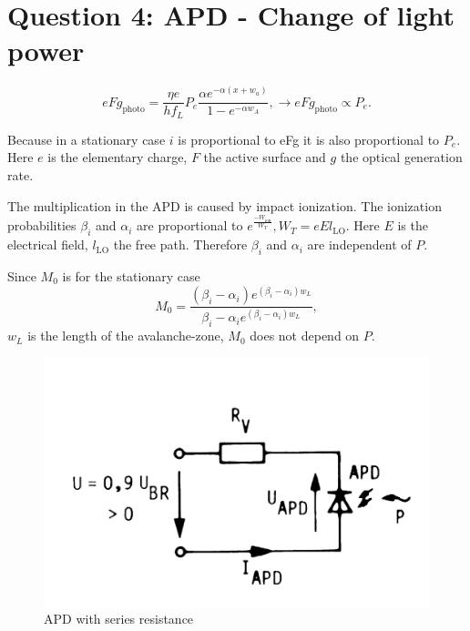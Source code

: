  

\section{Question 4: APD - Change of light power}

\begin{equation}
eFg_{\mathrm{photo}} = \frac{\eta e}{hf_L}P_e\frac{\alpha e^{-\alpha(x+w_a)}}{1-e^{-\alpha w_A}}, \rightarrow eFg_{\mathrm{photo}} \propto P_e.
\label{eq:}
\end{equation}

Because in a stationary case $i$ is proportional to eFg it is also proportional to $P_e$. Here $e$ is the elementary charge, $F$ the active surface and $g$ the optical generation rate.
 
The multiplication in the APD is caused by impact ionization. The ionization probabilities $\beta_i$ and $\alpha_i$ are proportional to $e^{\frac{-W_{\mathrm{ion}}}{W_T}},  W_T=eEl_\mathrm{LO}$. Here $E$ is the electrical field, $l_\mathrm{LO}$ the free path. Therefore $\beta_i$ and $\alpha_i$ are independent of $P$.

Since $M_0$ is for the stationary case 
\begin{equation}
M_0=\frac{(\beta_i  -\alpha_i)e^{(\beta_i-\alpha_i)w_L}}{\beta_i - \alpha_i e^{(\beta_i - \alpha_i)w_L}},
\label{eq:}
\end{equation}
$w_L$ is the length of the avalanche-zone, $M_0$ does not depend on $P$.
%
%
%
%
%
%
%
%
%


\begin{figure}%
\centering
\includegraphics[width=.5\columnwidth]{Grafiken/Q4_APD.jpg}%
\caption{APD with series resistance}%
\label{fig:Q4_APD}%
\end{figure}
